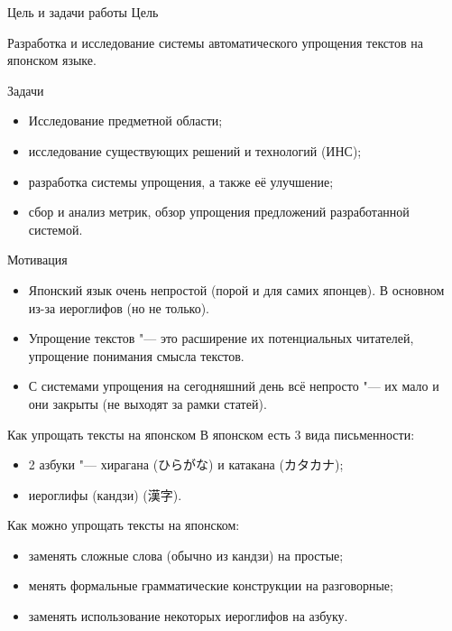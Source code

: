 \begin{frame}[fragile]{Цель и задачи работы}%
  \Large
  Цель
  \normalsize

  Разработка и исследование системы автоматического упрощения текстов на японском языке.

  \Large
  Задачи
  \normalsize

  \begin{itemize}%
    \item Исследование предметной области;
    \item исследование существующих решений и технологий (ИНС);
    \item разработка системы упрощения, а также её улучшение;
    \item сбор и анализ метрик, обзор упрощения предложений разработанной системой.
  \end{itemize}
\end{frame}


\begin{frame}[fragile]{Мотивация}%
  \begin{itemize}%
    \item Японский язык очень непростой (порой и для самих японцев). В основном из-за иероглифов (но не только).
    \item Упрощение текстов "--- это расширение их потенциальных читателей, упрощение понимания смысла текстов.
    \item С системами упрощения на сегодняшний день всё непросто "--- их мало и они закрыты (не выходят за рамки статей).
  \end{itemize}
\end{frame}


\begin{frame}[fragile]{Как упрощать тексты на японском}%
  В японском есть 3 вида письменности:
  \begin{itemize}%
    \item 2 азбуки "--- хирагана (ひらがな) и катакана (カタカナ);
    \item иероглифы (кандзи) (漢字).
  \end{itemize}

  Как можно упрощать тексты на японском:
  \begin{itemize}%
    \item заменять сложные слова (обычно из кандзи) на простые;
    \item менять формальные грамматические конструкции на разговорные;
    \item заменять использование некоторых иероглифов на азбуку.
  \end{itemize}
\end{frame}
